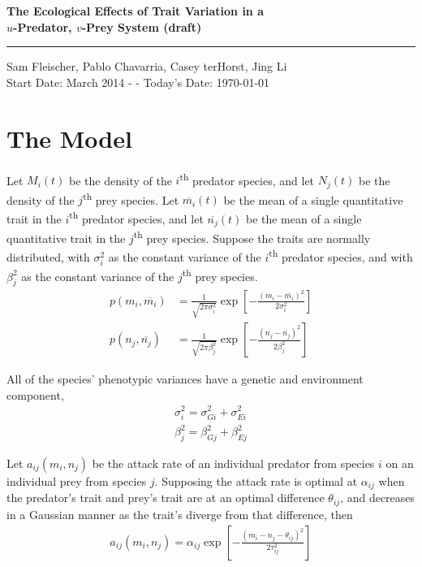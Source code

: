 \documentclass[12pt]{article}
\begin{document}
\begin{center}
	{\bf\LARGE The Ecological Effects of Trait Variation in a\\ \vskip 5pt$u$-Predator, $v$-Prey System \small (draft)}\\ \vskip 3pt \rule{4cm}{0.4pt}
	\vskip 5pt
	Sam Fleischer, Pablo Chavarria, Casey terHorst, Jing Li \\ Start Date:  March 2014 - - Today's Date: \today \rm
\end{center}

\vskip 15pt

									\section*{The Model}

Let $M_i(t)$ be the density of the $i$\textsuperscript{th} predator species, and let $N_j(t)$ be the density of the $j$\textsuperscript{th} prey species.  Let $\overline{m_i}(t)$ be the mean of a single quantitative trait in the $i$\textsuperscript{th} predator species, and let $\overline{n_j}(t)$ be the mean of a single quantitative trait in the $j$\textsuperscript{th} prey species.  Suppose the traits are normally distributed, with $\sigma_i^2$ as the constant variance of the $i$\textsuperscript{th} predator species, and with $\beta_j^2$ as the constant variance of the $j$\textsuperscript{th} prey species.
\begin{align*}
	p(m_i, \overline{m_i}) &= \frac{1}{\sqrt{2\pi\sigma_i^2}}\exp\left[{-\frac{(m_i - \overline{m_i})^2}{2\sigma_i^2}}\right] \\
	p(n_j, \overline{n_j}) &= \frac{1}{\sqrt{2\pi\beta_j^2}}\exp\left[{-\frac{(n_j - \overline{n_j})^2}{2\beta_j^2}}\right]
\end{align*}

\noindent All of the species' phenotypic variances have a genetic and environment component,
\begin{align*}
	\sigma_i^2 = \sigma_{Gi}^2 + \sigma_{Ei}^2 \\
	\beta_j^2 = \beta_{Gj}^2 + \beta_{Ej}^2
\end{align*}

\noindent Let $a_{ij}(m_i, n_j)$ be the attack rate of an individual predator from species $i$ on an individual prey from species $j$.  Supposing the attack rate is optimal at $\alpha_{ij}$ when the predator's trait and prey's trait are at an optimal difference $\theta_{ij}$, and decreases in a Gaussian manner as the trait's diverge from that difference, then
\begin{align*}
	a_{ij}(m_i, n_j) = \alpha_{ij} \exp\left[{-\frac{(m_i - n_j - \theta_{ij})^2}{2\tau_{ij}^2}}\right]
\end{align*}
\end{document}
